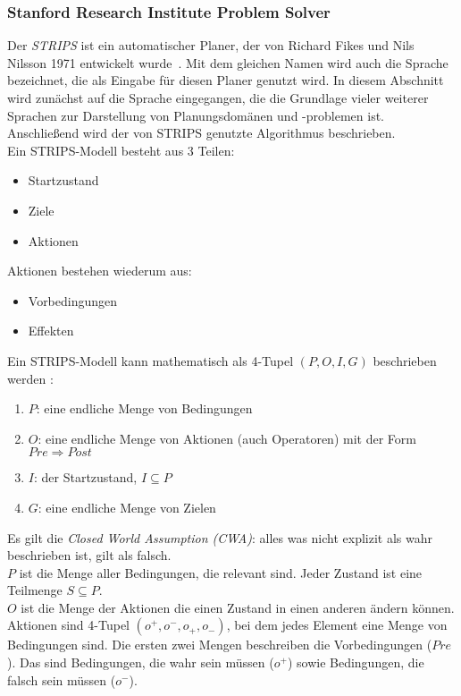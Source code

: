 \subsubsection{Stanford Research Institute Problem Solver}{\label{chap:strips}}
Der \emph{\ac{STRIPS}} ist ein automatischer Planer, der von Richard Fikes und Nils Nilsson 1971 entwickelt wurde~\cite{FIKES1971189}.
Mit dem gleichen Namen wird auch die Sprache bezeichnet, die als Eingabe für diesen Planer genutzt wird.
In diesem Abschnitt wird zunächst auf die Sprache eingegangen, die die Grundlage vieler weiterer Sprachen zur Darstellung von Planungsdomänen und -problemen ist.
Anschließend wird der von \ac{STRIPS} genutzte Algorithmus beschrieben.\\
Ein \ac{STRIPS}-Modell besteht aus 3 Teilen:
\begin{itemize}
    \item Startzustand
    \item Ziele
    \item Aktionen
\end{itemize}
Aktionen bestehen wiederum aus:
\begin{itemize}
    \item Vorbedingungen
    \item Effekten
\end{itemize}
Ein \ac{STRIPS}-Modell kann mathematisch als 4-Tupel \((P,O,I,G)\) beschrieben werden \cite{stripsdef}:
\begin{enumerate}
    \item \(P\): eine endliche Menge von Bedingungen
    \item \(O\): eine endliche Menge von Aktionen (auch Operatoren) mit der Form $Pre \Rightarrow Post$
    \item \(I\): der Startzustand, $I\subseteq P$
    \item \(G\): eine endliche Menge von Zielen
\end{enumerate}
Es gilt die \emph{Closed World Assumption (CWA)}: alles was nicht explizit als wahr beschrieben ist, gilt als falsch.\\
$P$ ist die Menge aller Bedingungen, die relevant sind.
Jeder Zustand ist eine Teilmenge $S\subseteq P$.\\
$O$ ist die Menge der Aktionen die einen Zustand in einen anderen ändern können.
Aktionen sind 4-Tupel \((o^+,o^-,o_+,o_-)\), bei dem jedes Element eine Menge von Bedingungen sind.
Die ersten zwei Mengen beschreiben die Vorbedingungen ($Pre$).
Das sind Bedingungen, die wahr sein müssen ($o^+$) sowie Bedingungen, die falsch sein müssen ($o^-$).
